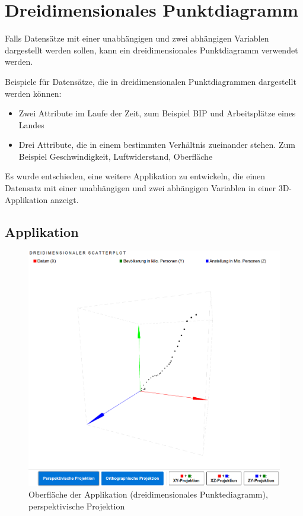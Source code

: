 \section{Dreidimensionales Punktdiagramm}

Falls Datensätze mit einer unabhängigen und zwei abhängigen Variablen dargestellt werden sollen, kann ein dreidimensionales Punktdiagramm verwendet werden.

Beispiele für Datensätze, die in dreidimensionalen Punktdiagrammen dargestellt werden können:

\begin{itemize}
	\item Zwei Attribute im Laufe der Zeit, zum Beispiel BIP und Arbeitsplätze eines Landes
	\item Drei Attribute, die in einem bestimmten Verhältnis zueinander stehen. Zum Beispiel Geschwindigkeit, Luftwiderstand, Oberfläche
\end{itemize}

Es wurde entschieden, eine weitere Applikation zu entwickeln, die einen Datensatz mit einer unabhängigen und zwei abhängigen Variablen in einer 3D-Applikation anzeigt.

\subsection{Applikation}

\begin{figure}[H]
	\centering
	\includegraphics[width=\linewidth]{images/3d}
	\caption{Oberfläche der Applikation (dreidimensionales Punktediagramm), perspektivische Projektion}
	\label{fig:3d}
\end{figure}

